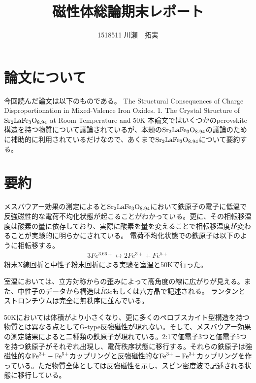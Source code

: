 \documentclass{jsarticle}
\begin{document}
\title{磁性体総論期末レポート}
\author{1518511 川瀬　拓実}
\maketitle

\newpage

\section{論文について}
今回読んだ論文は以下のものである。
The Structural Consequences of Charge Disproportionation in Mixed-Valence Iron Oxides. 1. The Crystal Structure of $\rm{Sr_{2}LaFe_{3}O_{8.94}}$ at Room Temperature and 50K
本論文ではいくつかのperovskite構造を持つ物質について議論されているが、本題の$\rm{Sr_{2}LaFe_{3}O_{8.94}}$の議論のために補助的に利用されているだけなので、あくまで$\rm{Sr_{2}LaFe_{3}O_{8.94}}$について要約する。

\section{要約}
メスバウアー効果の測定によると$\rm{Sr_{2}LaFe_{3}O_{8.94}}$において鉄原子の電子に低温で反強磁性的な電荷不均化状態が起こることがわかっている。更に、その相転移温度は酸素の量に依存しており、実際に酸素を量を変えることで相転移温度が変わることが実験的に明らかにされている。
電荷不均化状態での鉄原子は以下のように相転移する。
\begin{eqnarray}
3Fe^{3.66+} \leftrightarrow 2Fe^{3+} + Fe^{5+} \nonumber
\end{eqnarray}
粉末X線回折と中性子粉末回折による実験を室温と50Kで行った。

室温においては、立方対称からの歪みによって高角度の線に広がりが見える。また、中性子のデータから構造は$\overline{R}3c$もしくは六方晶で記述される。
ランタンとストロンチウムは完全に無秩序に並んでいる。

50Kにおいては体積がより小さくなり、更に多くのペロブスカイト型構造を持つ物質とは異なる点としてG-type反強磁性が現れない。そして、メスバウアー効果の測定結果によると二種類の鉄原子が現れている。2:1で価電子3つと価電子5つを持つ鉄原子がそれぞれ出現し、電荷秩序状態に移行する。それらの鉄原子は強磁性的な$\rm{Fe}^{3+}-\rm{Fe}^{5+}$カップリングと反強磁性的な$\rm{Fe}^{3+}-\rm{Fe}^{3+}$カップリングを作っている。ただ物質全体としては反強磁性を示し、スピン密度波で記述される状態に移行している。
\end{document}
